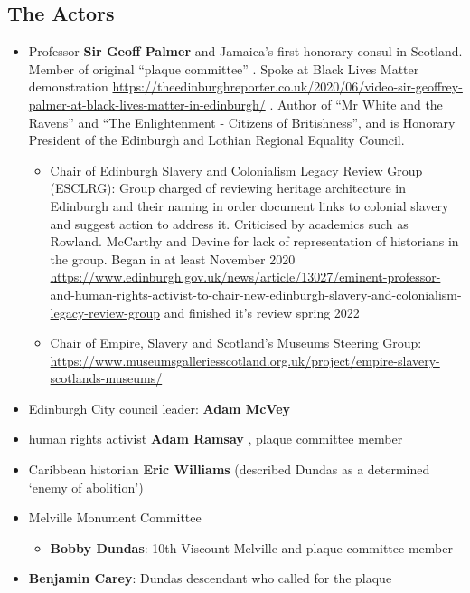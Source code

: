 \documentclass{scrartcl}
\begin{document}
\subsection{The Actors}\label{actors}

\begin{itemize}
    \item Professor \textbf{Sir Geoff Palmer} and Jamaica’s first honorary consul in Scotland. Member of original  ``plaque committee'' \cite{c4n_2018} \cite{hay_2020_2}. Spoke at Black Lives Matter demonstration \url{https://theedinburghreporter.co.uk/2020/06/video-sir-geoffrey-palmer-at-black-lives-matter-in-edinburgh/} . Author of ``Mr White and the Ravens'' and ``The Enlightenment - Citizens of Britishness'', and is Honorary President of the Edinburgh and Lothian Regional Equality Council.
    \begin{itemize}
        \item Chair of Edinburgh Slavery and Colonialism Legacy Review Group (ESCLRG): Group charged of reviewing heritage architecture in Edinburgh and their naming in order document links to colonial slavery and suggest action to address it. Criticised by academics such as Rowland. McCarthy and Devine for lack of representation of historians in the group. Began in at least November 2020 \url{https://www.edinburgh.gov.uk/news/article/13027/eminent-professor-and-human-rights-activist-to-chair-new-edinburgh-slavery-and-colonialism-legacy-review-group} and finished it's review spring 2022 \cite{esclr_2022}
        \item Chair of Empire, Slavery and Scotland’s Museums Steering Group: \url{https://www.museumsgalleriesscotland.org.uk/project/empire-slavery-scotlands-museums/}
    \end{itemize}
\item Edinburgh City council leader: \textbf{Adam McVey}
    \item human rights activist \textbf{Adam Ramsay} , plaque committee member \cite{c4n_2018}
    \item Caribbean historian\textbf{ Eric Williams} (described Dundas as a determined ‘enemy of abolition’) \cite{mullen_2021}
    \item  Melville Monument Committee
    \begin{itemize}
        \item \textbf{Bobby Dundas}: 10th Viscount Melville and plaque committee member \cite{c4n_2018}
    \end{itemize}
    \item \textbf{Benjamin Carey}: Dundas descendant who called for the plaque

\end{itemize}
\end{document}
